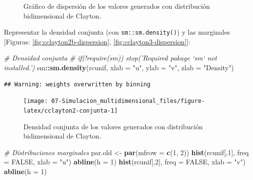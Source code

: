 \documentclass[
]{book}
\newenvironment{Shaded}{\begin{snugshade}}{\end{snugshade}}
\newcommand{\CommentTok}[1]{\textcolor[rgb]{0.56,0.35,0.01}{\textit{#1}}}
\newcommand{\DataTypeTok}[1]{\textcolor[rgb]{0.13,0.29,0.53}{#1}}
\newcommand{\DecValTok}[1]{\textcolor[rgb]{0.00,0.00,0.81}{#1}}
\newcommand{\KeywordTok}[1]{\textcolor[rgb]{0.13,0.29,0.53}{\textbf{#1}}}
\newcommand{\NormalTok}[1]{#1}
\newcommand{\OperatorTok}[1]{\textcolor[rgb]{0.81,0.36,0.00}{\textbf{#1}}}
\newcommand{\OtherTok}[1]{\textcolor[rgb]{0.56,0.35,0.01}{#1}}
\newcommand{\StringTok}[1]{\textcolor[rgb]{0.31,0.60,0.02}{#1}}
\theoremstyle{break}
\theoremstyle{definition}
\theoremstyle{definition}
\theoremstyle{definition}
\theoremstyle{remark}
\begin{document}
\begin{enumerate}
\begin{figure}[!htb]
{  }

  \caption{Gráfico de dispersión de los valores generados con distribución bidimensional de Clayton.}\label{fig:cclayton2-dispersion}
  \end{figure}

  Representar la densidad conjunta (con \texttt{sm::sm.density()}) y las marginales {[}Figuras: \ref{fig:cclayton2b-dispersion}, \ref{fig:cclayton3-dispersion}{]}:

\begin{Shaded}
\begin{Highlighting}[]
\CommentTok{# Densidad conjunta}
\CommentTok{# if(!require(sm)) stop('Required pakage `sm` not installed.')}
\NormalTok{sm}\OperatorTok{::}\KeywordTok{sm.density}\NormalTok{(rcunif, }\DataTypeTok{xlab =} \StringTok{"u"}\NormalTok{, }\DataTypeTok{ylab =} \StringTok{"v"}\NormalTok{, }\DataTypeTok{zlab =} \StringTok{"Density"}\NormalTok{)    }
\end{Highlighting}
\end{Shaded}

\begin{verbatim}
## Warning: weights overwritten by binning
\end{verbatim}

  \begin{figure}[!htb]

  {\centering \texttt{[image: 07-Simulacion\_multidimensional\_files/figure-latex/cclayton2-conjunta-1]} 

  }

  \caption{Densidad conjunta de los valores generados con distribución bidimensional de Clayton.}\label{fig:cclayton2-conjunta}
  \end{figure}

\begin{Shaded}
\begin{Highlighting}[]
\CommentTok{# Distribuciones marginales}
\NormalTok{par.old <-}\StringTok{ }\KeywordTok{par}\NormalTok{(}\DataTypeTok{mfrow =} \KeywordTok{c}\NormalTok{(}\DecValTok{1}\NormalTok{, }\DecValTok{2}\NormalTok{))}
\KeywordTok{hist}\NormalTok{(rcunif[,}\DecValTok{1}\NormalTok{], }\DataTypeTok{freq =} \OtherTok{FALSE}\NormalTok{, }\DataTypeTok{xlab =} \StringTok{"u"}\NormalTok{)}
\KeywordTok{abline}\NormalTok{(}\DataTypeTok{h =} \DecValTok{1}\NormalTok{)}
\KeywordTok{hist}\NormalTok{(rcunif[,}\DecValTok{2}\NormalTok{], }\DataTypeTok{freq =} \OtherTok{FALSE}\NormalTok{, }\DataTypeTok{xlab =} \StringTok{"v"}\NormalTok{)}
\KeywordTok{abline}\NormalTok{(}\DataTypeTok{h =} \DecValTok{1}\NormalTok{)}
\end{Highlighting}
\end{Shaded}


\end{enumerate}
\end{document}
